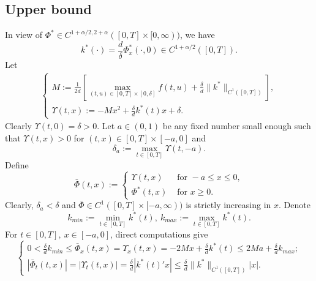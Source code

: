 \documentclass[11pt]{amsart}
\numberwithin{equation}{section}
\begin{document}
\subsection{Upper bound}
In view of $\Phi^{*}\in  C^{1+\alpha/2,2+\alpha}([0,T]\times[0,\infty))$, we have
\[k^*(\cdot)=\frac{d}{\delta}\Phi^{*}_x (\cdot,0)\in C^{1+\alpha/2}([0,T]).\]
Let
\begin{eqnarray*}
  \begin{cases} M:= \displaystyle \frac{1}{2d}\left[\max_{(t,u)\in[0,T]\times[0,\delta]}f(t,u)+\frac{\delta }{d}\|k^*\|_{C^{1}([0,T])}\right],\\[2mm]
   \Upsilon(t,x):=-Mx^2+\frac{\delta}{d}k^*(t)x+\delta.
   \end{cases}
\end{eqnarray*}
Clearly $\Upsilon(t, 0)=\delta>0$.
Let  $a\in(0,1)$ be any fixed number small enough such that  $\Upsilon(t,x)>0$ for $(t,x)\in[0,T]\times[-a,0]$ and  
\begin{equation*}
  \delta_a:= \max_{t\in[0,T]}\Upsilon(t,-a).
\end{equation*} 
Define 
\begin{equation*}
  \bar{\Phi}(t,x):=\begin{cases}
  \Upsilon(t,x)& \text{ for }-a\leq x\leq 0,\\
  \Phi^*(t,x) &\text{ for }x\geq 0.
  \end{cases}
\end{equation*}
Clearly, $\delta_a<\delta$ and $\bar{\Phi}\in C^1([0,T]\times[-a,\infty))$ is strictly increasing in $x$. Denote
\begin{equation}\label{eq-k+-}
   k_{min}:=\min_{t\in[0,T]}k^*(t),\  k_{max}:=\max_{t\in[0,T]}k^*(t).
\end{equation}
For $t\in [0,T],\ x\in[-a,0]$, direct computations give
\begin{equation}\label{eq-upes}
  \begin{cases}
    0<\frac{\delta}{d} k_{min} \leq  \bar{\Phi}_x(t,x)=\Upsilon_x(t,x)=-2Mx+\frac{\delta}{d}k^*(t)\leq2M a+\frac{\delta}{d}k_{max}; \\
|\bar{\Phi}_t(t,x)|=|\Upsilon_t(t,x)|=\frac{\delta}{d}|k^{*}(t)'x|\leq \frac{\delta}{d}\|k^*\|_{C^1([0,T])}|x|.
  \end{cases}
\end{equation}
\end{document}
